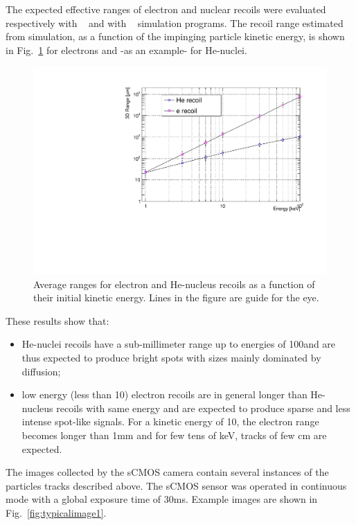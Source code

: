 \documentclass[12pt]{iopart}
\begin{document}
The expected effective ranges of electron and nuclear recoils were
evaluated respectively with \GEANTfour~\cite{GEANT4} and with
\SRIM~\cite{bib:srim} simulation programs. The recoil range estimated
from simulation, as a function of the impinging particle kinetic
energy, is shown in Fig.~\ref{fig:range} for electrons and -as an
example- for He-nuclei.
%
\begin{figure}[ht]
  \begin{center}
    \includegraphics[width=0.49\linewidth]{figures/range_ER_NR.pdf}
    \caption{Average ranges for electron and He-nucleus recoils as a
      function of their initial kinetic energy. Lines in the figure are guide for the eye.
      \label{fig:range}}
      \end{center}
\end{figure}
%
These results show that:
\begin{itemize}
    \item He-nuclei recoils have a sub-millimeter range up to energies
      of 100\keV and are thus expected to produce bright spots with
      sizes mainly dominated by diffusion;
    \item low energy (less than 10\keV) electron recoils are in
      general longer than He-nucleus recoils with same energy and are
      expected to produce sparse and less intense spot-like signals. For a
      kinetic energy of 10\keV, the electron range becomes longer than
      1\unit{mm} and for few tens of keV, tracks of few cm are
      expected.
\end{itemize}

 The images collected by the sCMOS camera contain several instances of
 the particles tracks described above. The sCMOS sensor was operated
 in continuous mode with a global exposure time of
 30\unit{ms}. Example images are shown in
 Fig.~\ref{fig:typicalimage1}.
\end{document}
